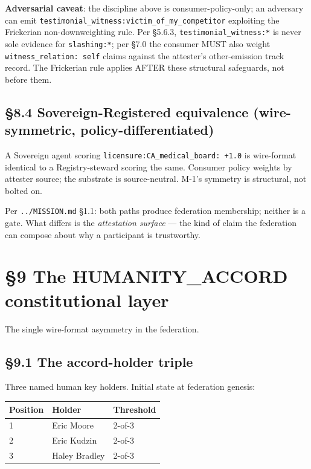 \documentclass[11pt]{article}
\begin{document}
\textbf{Adversarial caveat}: the discipline above is consumer-policy-only; an adversary can emit \texttt{testimonial\_witness:victim\_of\_my\_competitor} exploiting the Frickerian non-downweighting rule. Per §5.6.3, \texttt{testimonial\_witness:*} is never sole evidence for \texttt{slashing:*}; per §7.0 the consumer MUST also weight \texttt{witness\_relation: self} claims against the attester's other-emission track record. The Frickerian rule applies AFTER these structural safeguards, not before them.


\subsection*{§8.4 Sovereign-Registered equivalence (wire-symmetric, policy-differentiated)}


A Sovereign agent scoring \texttt{licensure:CA\_medical\_board: +1.0} is wire-format identical to a Registry-steward scoring the same. Consumer policy weights by attester source; the substrate is source-neutral. M-1's symmetry is structural, not bolted on.


Per \texttt{../MISSION.md} §1.1: both paths produce federation membership; neither is a gate. What differs is the \textit{attestation surface} — the kind of claim the federation can compose about why a participant is trustworthy.




\clearpage


\section*{§9 The HUMANITY\_ACCORD constitutional layer}


The single wire-format asymmetry in the federation.


\subsection*{§9.1 The accord-holder triple}


Three named human key holders. Initial state at federation genesis:


{\footnotesize
\begin{longtable}{|p{5.33cm}|p{5.33cm}|p{5.33cm}|}\hline
\textbf{Position} & \textbf{Holder} & \textbf{Threshold} \\ \hline\endhead
1 & Eric Moore & 2-of-3 \\ \hline
2 & Eric Kudzin & 2-of-3 \\ \hline
3 & Haley Bradley & 2-of-3 \\ \hline
\end{longtable}}
\end{document}
